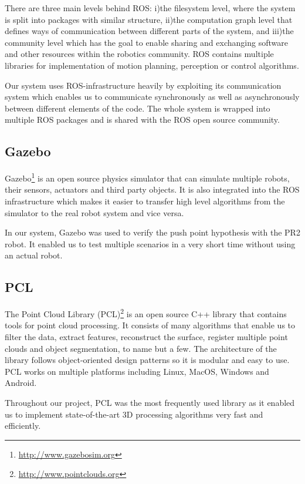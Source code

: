 There are three main levels behind ROS: i)the filesystem level, where the system is split into packages with similar structure, ii)the computation graph level that defines ways of communication between different parts of the system, and iii)the community level which has the goal to enable sharing and exchanging software and other resources within the robotics community. ROS contains multiple libraries for implementation of motion planning, perception or control algorithms.

Our system uses ROS-infrastructure heavily by exploiting its communication system which enables us to communicate synchronously as well as asynchronously between different elements of the code. The whole system is wrapped into multiple ROS packages and is shared with the ROS open source community.




\subsection{Gazebo}
Gazebo\footnote{\url{http://www.gazebosim.org}} is an open source physics simulator that can simulate multiple robots, their sensors, actuators and third party objects. It is also integrated into the ROS infrastructure which makes it easier to transfer high level algorithms  from the simulator to the real robot system and vice versa.  

In our system, Gazebo was used to verify the push point hypothesis with the PR2 robot. It enabled us to test multiple scenarios in a very short time without using an actual robot.


\subsection{PCL}
The Point Cloud Library (PCL)\footnote{\url{http://www.pointclouds.org}} is an open source C++ library that contains tools for point cloud processing. It consists of many algorithms that enable us to filter the data, extract features, reconstruct the surface, register multiple point clouds and object segmentation, to name but a few. The architecture of the library follows object-oriented design patterns so it is modular and easy to use. PCL works on multiple platforms including Linux, MacOS, Windows and Android. 

Throughout our project, PCL was the most frequently used library as it enabled us to implement state-of-the-art 3D processing algorithms very fast and efficiently.  

